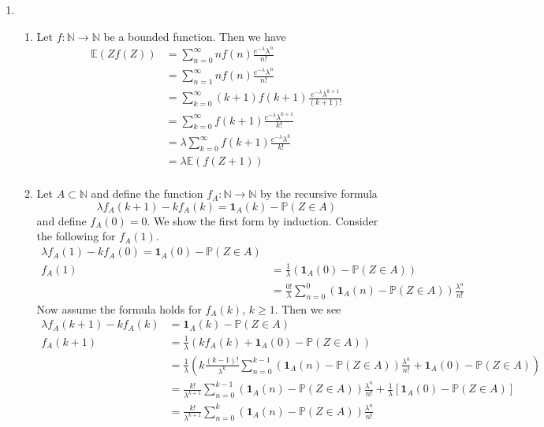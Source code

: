 \documentclass[12pt]{article}  %
\newcommand{\N}{{\mathbb{N}}}
\newcommand{\E}{{\mathbb{E}}}
\newcommand{\prob}{{\mathbb{P}}}
\newcommand{\ind}{{\mathbf{1}}}
\begin{document}
\begin{enumerate}

\item 
\begin{enumerate}
	\item Let $f:\N\to\N$ be a bounded function. Then we have 
	\begin{align*}
	\E(Zf(Z)) &= \sum_{n=0}^{\infty}nf(n)\frac{e^{-\lambda}\lambda^n}{n!}\\
	&= \sum_{n=1}^{\infty}nf(n)\frac{e^{-\lambda}\lambda^n}{n!}\\
	&= \sum_{k=0}^{\infty}(k+1)f(k+1)\frac{e^{-\lambda}\lambda^{k+1}}{(k+1)!}\\
	&= \sum_{k=0}^{\infty}f(k+1)\frac{e^{-\lambda}\lambda^{k+1}}{k!}\\
	&= \lambda\sum_{k=0}^{\infty}f(k+1)\frac{e^{-\lambda}\lambda^{k}}{k!}\\
	&= \lambda\E(f(Z+1))\\
	\end{align*}
\item Let $A\subset \N$ and define the function $f_A:\N\to\N$ by the recursive formula $$\lambda f_A(k+1) -kf_A(k) = \ind_A(k) - \prob(Z\in A)$$ and define $f_A(0) = 0$. We show the first form by induction. Consider the following for $f_A(1)$. 
\begin{align*}
\lambda f_A(1) -kf_A(0) = \ind_A(0) -\prob(Z\in A)\\
f_A(1) &= \frac{1}{\lambda}\left(\ind_A(0) -\prob(Z\in A)\right)\\
&= \frac{0!}{\lambda}\sum_{n=0}^0\left(\ind_A(n)-\prob(Z\in A)\right)\frac{\lambda^n}{n!} 
\end{align*}
Now assume the formula holds for $f_A(k)$, $k\geq 1$. Then we see 
\begin{align*}
\lambda f_A(k+1) -kf_A(k) &= \ind_A(k) -\prob(Z\in A)\\
f_A(k+1) &= \frac{1}{\lambda}\left(kf_A(k) + \ind_A(0) -\prob(Z\in A)\right)\\
&= \frac{1}{\lambda}\left(k\frac{(k-1)!}{\lambda^k}\sum_{n=0}^{k-1}\left(\ind_A(n)-\prob(Z\in A)\right)\frac{\lambda^n}{n!}  + \ind_A(0) -\prob(Z\in A)\right)\\
&= \frac{k!}{\lambda^{k+1}}\sum_{n=0}^{k-1}\left(\ind_A(n)-\prob(Z\in A)\right)\frac{\lambda^n}{n!}  + \frac{1}{\lambda}[\ind_A(0) -\prob(Z\in A)]\\
&= \frac{k!}{\lambda^{k+1}}\sum_{n=0}^{k}\left(\ind_A(n)-\prob(Z\in A)\right)\frac{\lambda^n}{n!}\\
\end{align*}

\end{enumerate}
\end{enumerate}
\end{document}
